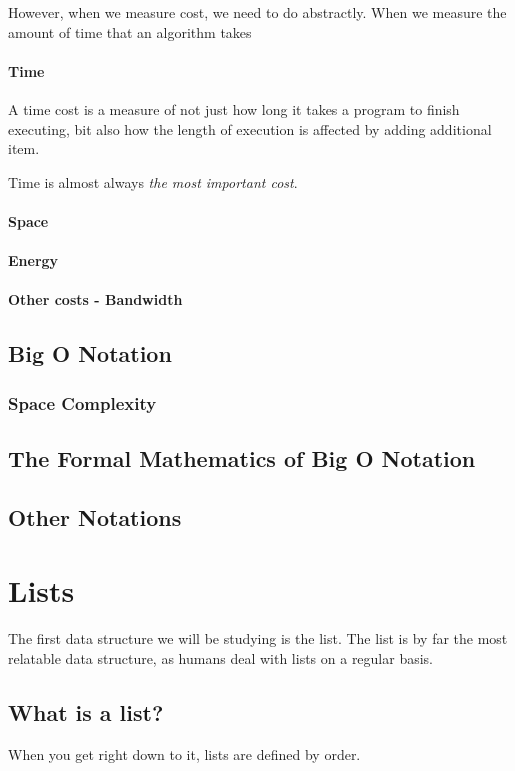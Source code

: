 \documentclass[10pt,a4paper]{book}
\begin{document}
However, when we measure cost, we need to do abstractly.  
When we measure the amount of time that an algorithm takes

\subsubsection{Time}
A time cost is a measure of not just how long it takes a program to finish executing, bit also how the length of execution is affected by adding additional item.

Time is almost always \emph{the most important cost}.

\subsubsection{Space}
\subsubsection{Energy}
\subsubsection{Other costs - Bandwidth}

\section{Big O Notation}
\subsection{Space Complexity}

\section{The Formal Mathematics of Big O Notation}
\section{Other Notations}

\chapter{Lists}
The first data structure we will be studying is the list.
The list is by far the most relatable data structure, as humans deal with lists on a regular basis.

\section{What is a list?}
When you get right down to it, lists are defined by order.
\end{document}
